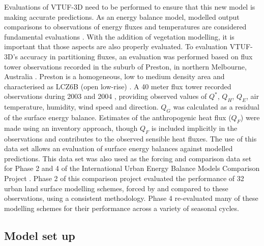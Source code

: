 \documentclass[final,3p,times,authoryear]{elsarticle}
\begin{document}
Evaluations of VTUF-3D need to be performed to ensure that this new model is making accurate predictions. As an energy balance model, modelled output comparisons to observations of energy fluxes and temperatures are considered fundamental evaluations \citep{Masson2002a}. With the addition of vegetation modelling, it is important that those aspects are also properly evaluated. To evaluation VTUF-3D's accuracy in partitioning fluxes, an evaluation was performed based on flux tower observations recorded in the suburb of Preston, in northern Melbourne, Australia \citep{Coutts2007}. Preston is a homogeneous, low to medium density area and characterised as LCZ6B (open low-rise) \citep{Stewart2012b}. A 40 meter flux tower recorded observations during 2003 and 2004 \citep{Coutts2007}, providing observed values of $Q^{*}$, $Q_{H}$, $Q_{E}$, air temperature, humidity, wind speed and direction. $Q_{G}$ was calculated as a residual of the surface energy balance. Estimates of the anthropogenic heat flux ($Q_{F}$) were made using an inventory approach, though $Q_{F}$ is included implicitly in the observations and contributes to the observed sensible heat fluxes. The use of this data set allows an evaluation of surface energy balances against modelled predictions. This data set was also used as the forcing and comparison data set for Phase 2 and 4 of the International Urban Energy Balance Models Comparison Project \citep{Grimmond2011,Best2012}. Phase 2 of this comparison project evaluated the performance of 32 urban land surface modelling schemes, forced by and compared to these observations, using a consistent methodology. Phase 4 re-evaluated many of these modelling schemes for their performance across a variety of seasonal cycles.

\subsection{Model set up}\label{sec:modelsetup}
\end{document}

